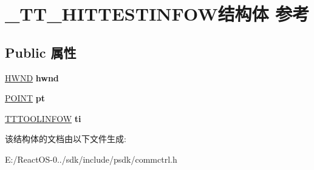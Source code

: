 \hypertarget{struct___t_t___h_i_t_t_e_s_t_i_n_f_o_w}{}\section{\+\_\+\+T\+T\+\_\+\+H\+I\+T\+T\+E\+S\+T\+I\+N\+F\+O\+W结构体 参考}
\label{struct___t_t___h_i_t_t_e_s_t_i_n_f_o_w}
\subsection*{Public 属性}
\begin{DoxyCompactItemize}
\item 
\mbox{\label{struct___t_t___h_i_t_t_e_s_t_i_n_f_o_w_a465a3241cc7e4d14e97e6eff1d6a7219}} 
\hyperlink{interfacevoid}{H\+W\+ND} {\bfseries hwnd}
\item 
\mbox{\label{struct___t_t___h_i_t_t_e_s_t_i_n_f_o_w_a848b8c63fcbca2de1897b966ed5171c7}} 
\hyperlink{structtag_p_o_i_n_t}{P\+O\+I\+NT} {\bfseries pt}
\item 
\mbox{\label{struct___t_t___h_i_t_t_e_s_t_i_n_f_o_w_a10afb0b9d1942aad512c33cfc6ff4866}} 
\hyperlink{structtag_t_o_o_l_i_n_f_o_w}{T\+T\+T\+O\+O\+L\+I\+N\+F\+OW} {\bfseries ti}
\end{DoxyCompactItemize}


该结构体的文档由以下文件生成\+:\begin{DoxyCompactItemize}
\item 
E\+:/\+React\+O\+S-\/0../sdk/include/psdk/commctrl.\+h\end{DoxyCompactItemize}
